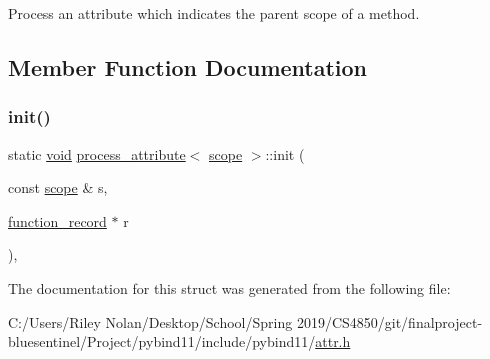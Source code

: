 Process an attribute which indicates the parent scope of a method. 

\subsection{Member Function Documentation}
\mbox{\label{structprocess__attribute_3_01scope_01_4_ae4a63c947913d6a637f865a2801ed778}} 
\subsubsection{\texorpdfstring{init()}{init()}}
{\footnotesize\ttfamily static \mbox{\hyperlink{_s_d_l__opengles2__gl2ext_8h_ae5d8fa23ad07c48bb609509eae494c95}{void}} \mbox{\hyperlink{structprocess__attribute}{process\+\_\+attribute}}$<$ \mbox{\hyperlink{structscope}{scope}} $>$\+::init (\begin{DoxyParamCaption}\item[{const \mbox{\hyperlink{structscope}{scope}} \&}]{s,  }\item[{\mbox{\hyperlink{structfunction__record}{function\+\_\+record}} $\ast$}]{r }\end{DoxyParamCaption})\hspace{0.3cm}{\ttfamily [inline]}, {\ttfamily [static]}}



The documentation for this struct was generated from the following file\+:\begin{DoxyCompactItemize}
\item 
C\+:/\+Users/\+Riley Nolan/\+Desktop/\+School/\+Spring 2019/\+C\+S4850/git/finalproject-\/bluesentinel/\+Project/pybind11/include/pybind11/\mbox{\hyperlink{attr_8h}{attr.\+h}}\end{DoxyCompactItemize}
